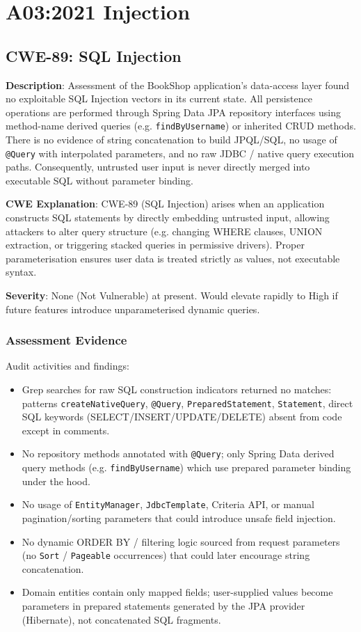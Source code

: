 \documentclass[]{UCD_CS_FYP_Report}
\begin{document}
\chapter{A03:2021 Injection}

\section{CWE-89: SQL Injection}

	\textbf{Description}: Assessment of the BookShop application's data-access layer found no exploitable SQL Injection vectors in its current state. All persistence operations are performed through Spring Data JPA repository interfaces using method-name derived queries (e.g. \texttt{findByUsername}) or inherited CRUD methods. There is no evidence of string concatenation to build JPQL/SQL, no usage of \texttt{@Query} with interpolated parameters, and no raw JDBC / native query execution paths. Consequently, untrusted user input is never directly merged into executable SQL without parameter binding.

	\textbf{CWE Explanation}: CWE-89 (SQL Injection) arises when an application constructs SQL statements by directly embedding untrusted input, allowing attackers to alter query structure (e.g. changing WHERE clauses, UNION extraction, or triggering stacked queries in permissive drivers). Proper parameterisation ensures user data is treated strictly as values, not executable syntax.

	\textbf{Severity}: None (Not Vulnerable) at present. Would elevate rapidly to High if future features introduce unparameterised dynamic queries.

\subsection*{Assessment Evidence}
Audit activities and findings:
\begin{itemize}
 \item Grep searches for raw SQL construction indicators returned no matches: patterns \texttt{createNativeQuery}, \texttt{@Query}, \texttt{PreparedStatement}, \texttt{Statement}, direct SQL keywords (SELECT/INSERT/UPDATE/DELETE) absent from code except in comments.
 \item No repository methods annotated with \texttt{@Query}; only Spring Data derived query methods (e.g. \texttt{findByUsername}) which use prepared parameter binding under the hood.
 \item No usage of \texttt{EntityManager}, \texttt{JdbcTemplate}, Criteria API, or manual pagination/sorting parameters that could introduce unsafe field injection.
 \item No dynamic ORDER BY / filtering logic sourced from request parameters (no \texttt{Sort} / \texttt{Pageable} occurrences) that could later encourage string concatenation.
 \item Domain entities contain only mapped fields; user-supplied values become parameters in prepared statements generated by the JPA provider (Hibernate), not concatenated SQL fragments.
\end{itemize}
\end{document}
